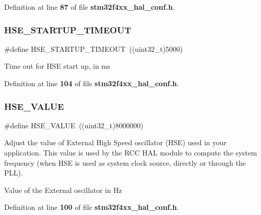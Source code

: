 Definition at line \textbf{ 87} of file \textbf{ stm32f4xx\+\_\+hal\+\_\+conf.\+h}.

\mbox{\label{stm32f4xx__hal__conf_8h_a68ecbc9b0a1a40a1ec9d18d5e9747c4f}} 
\subsubsection{H\+S\+E\+\_\+\+S\+T\+A\+R\+T\+U\+P\+\_\+\+T\+I\+M\+E\+O\+UT}
{\footnotesize\ttfamily \#define H\+S\+E\+\_\+\+S\+T\+A\+R\+T\+U\+P\+\_\+\+T\+I\+M\+E\+O\+UT~((uint32\+\_\+t)5000)}

Time out for H\+SE start up, in ms 

Definition at line \textbf{ 104} of file \textbf{ stm32f4xx\+\_\+hal\+\_\+conf.\+h}.

\mbox{\label{stm32f4xx__hal__conf_8h_aeafcff4f57440c60e64812dddd13e7cb}} 
\subsubsection{H\+S\+E\+\_\+\+V\+A\+L\+UE}
{\footnotesize\ttfamily \#define H\+S\+E\+\_\+\+V\+A\+L\+UE~((uint32\+\_\+t)8000000)}



Adjust the value of External High Speed oscillator (H\+SE) used in your application. This value is used by the R\+CC H\+AL module to compute the system frequency (when H\+SE is used as system clock source, directly or through the P\+LL). 

Value of the External oscillator in Hz 

Definition at line \textbf{ 100} of file \textbf{ stm32f4xx\+\_\+hal\+\_\+conf.\+h}.

\mbox{\label{stm32f4xx__hal__conf_8h_aaa8c76e274d0f6dd2cefb5d0b17fbc37}} 
